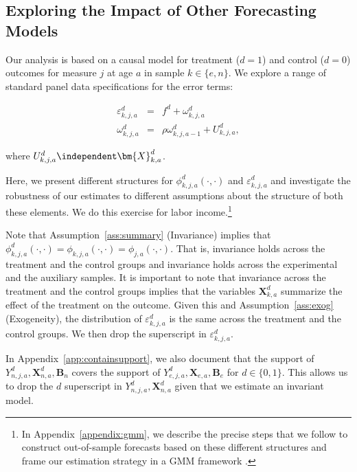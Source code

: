 \subsection{Exploring the Impact of Other Forecasting Models} \label{appendix:predsensitivity}

Our analysis is based on a causal model for treatment ($d=1$) and control ($d=0$) outcomes for measure $j$ at age $a$ in sample $k \in \{e,n\}$. We explore a range of standard panel data specifications for the error terms:

\begin{eqnarray}
\varepsilon^d_{k,j,a} &=& f^d + \omega^d_{k,j,a} \nonumber \\
\omega^d_{k,j,a}      &=& \rho \omega^d_{k,j,a-1} + U^d_{k,j,a},
\end{eqnarray}

\noindent where $U^d_{k,j,a} \independent \bm{X}^d_{k,a}$.

Here, we present different structures for $\phi_{k,j,a}^d \left( \cdot, \cdot \right)$ and $\varepsilon_{k,j,a}^d$ and investigate the robustness of our estimates to different assumptions about the structure of both these elements. We do this exercise for labor income.\footnote{In Appendix~\ref{appendix:gmm}, we describe the precise steps that we follow to construct out-of-sample forecasts based on these different structures and frame our estimation strategy in a GMM framework \citep{Hansen_1982_Econometrica}.}

Note that Assumption~\ref{ass:summary} (Invariance) implies that $\phi_{k,j,a}^d \left (\cdot, \cdot \right) = \phi_{k,j,a}  \left (\cdot, \cdot \right) = \phi_{j,a}  \left (\cdot, \cdot \right)$. That is, invariance holds across the treatment and the control groups and invariance holds across the experimental and the auxiliary samples. It is important to note that invariance across the treatment and the control groups implies that the variables $\bm{X}_{k,a}^d$ summarize the effect of the treatment on the outcome. Given this and Assumption~\ref{ass:exog} (Exogeneity), the distribution of $\varepsilon_{k,j,a}^d$ is the same across the treatment and the control groups. We then drop the superscript in $\varepsilon_{k,j,a}^d$.

In Appendix~\ref{app:containsupport}, we also document that the support of $Y_{n,j,a}^d, \bm{X}_{n,a}^d, \bm{B}_{n}$ covers the support of $Y_{e,j,a}^d, \bm{X}_{e,a}, \bm{B}_{e}$ for $d \in \{0, 1\}$. This allows us to drop the $d$ superscript in $Y_{n,j,a}^d, \bm{X}_{n,a}^d$ given that we estimate an invariant model.

